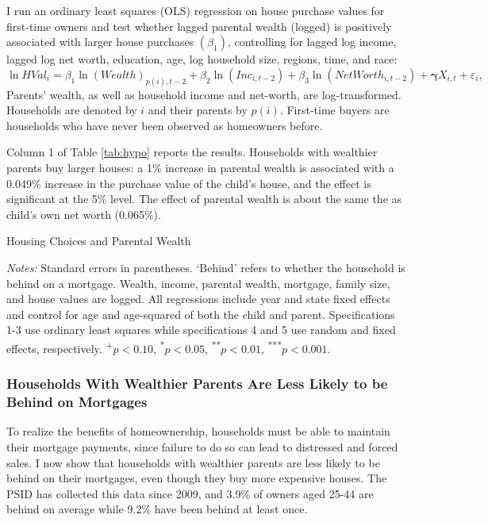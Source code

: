 \documentclass[12pt]{article}
\begin{document}
I run an ordinary least squares (OLS) regression on house purchase values for first-time owners and test whether lagged parental wealth (logged) is positively associated with larger house purchases $(\beta_1)$, controlling for lagged log income, lagged log net worth, education, age, log household size, regions, time, and race:
\begin{equation*}
\ln{HVal_{i}} = \beta_1 \ln(Wealth)_{p(i),t-2}  + \beta_2 \ln(Inc_{i,t-2}) + \beta_3 \ln(NetWorth_{i,t-2}) + \mathbf{\gamma}{X_{i,t}} + \varepsilon_{i},
\end{equation*}
Parents' wealth, as well as household income and net-worth, are log-transformed. Households are denoted by $i$ and their parents by $p(i)$. First-time buyers are households who have never been observed as homeowners before.

Column 1 of Table \ref{tab:hypo} reports the results. Households with wealthier parents buy larger houses: a 1\% increase in parental wealth is associated with a 0.049\% increase in the purchase value of the child's house, and the effect is significant at the 5\% level. The effect of parental wealth is about the same the as child's own net worth (0.065\%).


\begin{table}
	\center
	\begin{threeparttable}
		\caption{Housing Choices and Parental Wealth}
		\label{tab:hypo}
		\small 
				

		{\begin{footnotesize}\begin{flushleft}
		\textit{Notes:} Standard errors in parentheses. `Behind' refers to whether the household is behind on a mortgage. Wealth, income, parental wealth, mortgage, family size, and house values are logged. All regressions include year and state fixed effects and control for age and age-squared of both the child and parent. Specifications 1-3 use ordinary least squares while specifications 4 and 5 use random and fixed effects, respectively. \textsuperscript{+}$p<0.10$, \textsuperscript{*}$p<0.05$, \textsuperscript{**}$p<0.01$, \textsuperscript{***}$p<0.001$.
		\end{flushleft}\end{footnotesize}}		
	\end{threeparttable}
\end{table}

\subsubsection{Households With Wealthier Parents Are Less Likely to be Behind on Mortgages} 
To realize the benefits of homeownership, households must be able to maintain their mortgage payments, since failure to do so can lead to distressed and forced sales. I now show that households with wealthier parents are less likely to be behind on their mortgages, even though they buy more expensive houses. The PSID has collected this data since 2009, and 3.9\% of owners aged 25-44 are behind on average while 9.2\% have been behind at least once.
\end{document}
